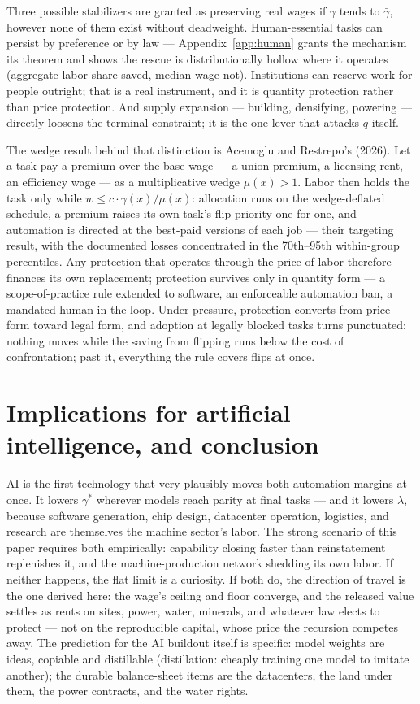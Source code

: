 \documentclass[12pt]{article}
\theoremstyle{plain}
\begin{document}
Three possible stabilizers are granted as preserving real wages if $\gamma$ tends to $\bar{\gamma}$, however none of them exist without deadweight. Human-essential tasks can persist by preference or by law --- Appendix~\ref{app:human} grants the mechanism its theorem and shows the rescue is distributionally hollow where it operates (aggregate labor share saved, median wage not). Institutions can reserve work for people outright; that is a real instrument, and it is quantity protection rather than price protection. And supply expansion --- building, densifying, powering --- directly loosens the terminal constraint; it is the one lever that attacks $q$ itself.

The wedge result behind that distinction is Acemoglu and Restrepo's (2026). Let a task pay a premium over the base wage --- a union premium, a licensing rent, an efficiency wage --- as a multiplicative wedge $\mu (x) > 1$. Labor then holds the task only while $w \le c\cdot \gamma (x)/\mu (x)$: allocation runs on the wedge-deflated schedule, a premium raises its own task's flip priority one-for-one, and automation is directed at the best-paid versions of each job --- their targeting result, with the documented losses concentrated in the 70th--95th within-group percentiles. Any protection that operates through the price of labor therefore finances its own replacement; protection survives only in quantity form --- a scope-of-practice rule extended to software, an enforceable automation ban, a mandated human in the loop. Under pressure, protection converts from price form toward legal form, and adoption at legally blocked tasks turns punctuated: nothing moves while the saving from flipping runs below the cost of confrontation; past it, everything the rule covers flips at once.

\section{Implications for artificial intelligence, and conclusion}\label{sec:ai}

AI is the first technology that very plausibly moves both automation margins at once. It lowers $\gamma ^*$ wherever models reach parity at final tasks --- and it lowers $\lambda$, because software generation, chip design, datacenter operation, logistics, and research are themselves the machine sector's labor. The strong scenario of this paper requires both empirically: capability closing faster than reinstatement replenishes it, and the machine-production network shedding its own labor. If neither happens, the flat limit is a curiosity. If both do, the direction of travel is the one derived here: the wage's ceiling and floor converge, and the released value settles as rents on sites, power, water, minerals, and whatever law elects to protect --- not on the reproducible capital, whose price the recursion competes away. The prediction for the AI buildout itself is specific: model weights are ideas, copiable and distillable (distillation: cheaply training one model to imitate another); the durable balance-sheet items are the datacenters, the land under them, the power contracts, and the water rights.
\end{document}
